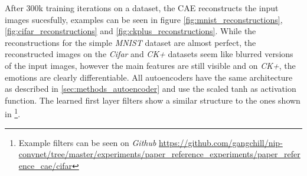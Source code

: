 \documentclass{article}
\begin{document}
    After 300k training iterations on a dataset, the CAE reconstructs the input images sucesfully, examples can be seen in figure \ref{fig:mnist_reconstructions}, \ref{fig:cifar_reconstructions} and \ref{fig:ckplus_reconstructions}. While the reconstructions for the simple \emph{MNIST} dataset are almost perfect, the reconstructed images on the \emph{Cifar} and \emph{CK+} datasets seem like blurred versions of the input images, however the main features are still visible and on \emph{CK+}, the emotions are clearly differentiable. All autoencoders have the same architecture as described in \ref{sec:methods_autoencoder} and use the scaled tanh as activation function. The learned first layer filters show a similar structure to the ones shown in \citep{masci11}\footnote{Example filters can be seen on \emph{Github} \url{https://github.com/gangchill/nip-convnet/tree/master/experiments/paper_reference_experiments/paper_reference_cae/cifar}}. 
\end{document}
